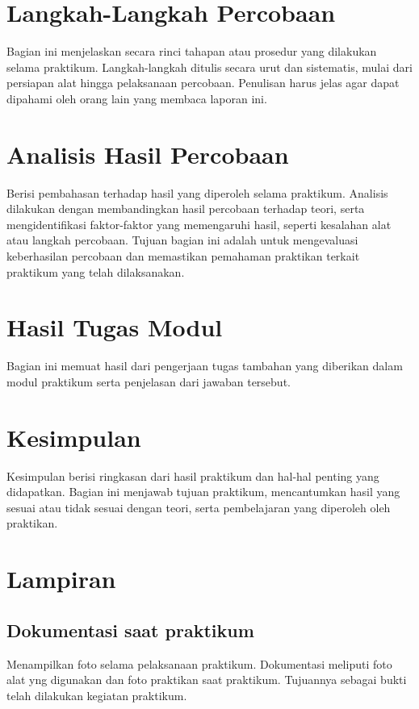 \section{Langkah-Langkah Percobaan}
Bagian ini menjelaskan secara rinci tahapan atau prosedur yang dilakukan selama praktikum. Langkah-langkah ditulis secara urut dan sistematis, mulai dari persiapan alat hingga pelaksanaan percobaan. Penulisan harus jelas agar dapat dipahami oleh orang lain yang membaca laporan ini.

\section{Analisis Hasil Percobaan}
Berisi pembahasan terhadap hasil yang diperoleh selama praktikum. Analisis dilakukan dengan membandingkan hasil percobaan terhadap teori, serta mengidentifikasi faktor-faktor yang memengaruhi hasil, seperti kesalahan alat atau langkah percobaan. Tujuan bagian ini adalah untuk mengevaluasi keberhasilan percobaan dan memastikan pemahaman praktikan terkait praktikum yang telah dilaksanakan.

\section{Hasil Tugas Modul}
Bagian ini memuat hasil dari pengerjaan tugas tambahan yang diberikan dalam modul praktikum serta penjelasan dari jawaban tersebut. 

\section{Kesimpulan}
Kesimpulan berisi ringkasan dari hasil praktikum dan hal-hal penting yang didapatkan. Bagian ini menjawab tujuan praktikum, mencantumkan hasil yang sesuai atau tidak sesuai dengan teori, serta pembelajaran yang diperoleh oleh praktikan.

\section{Lampiran}
\subsection{Dokumentasi saat praktikum}
Menampilkan foto selama pelaksanaan praktikum. Dokumentasi meliputi foto alat yng digunakan dan foto praktikan saat praktikum. Tujuannya sebagai bukti telah dilakukan kegiatan praktikum.


